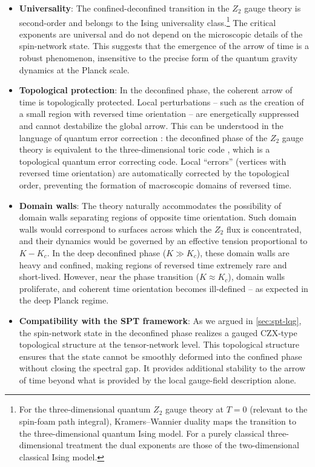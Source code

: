 \documentclass[preprint]{SciPost}
\theoremstyle{plain} %
\begin{document}
\begin{itemize}
	\item \textbf{Universality}: The confined-deconfined transition in the $Z_2$ gauge theory is second-order and belongs to the Ising universality class.\footnote{For the three-dimensional quantum $Z_2$ gauge theory at $T=0$ (relevant to the spin-foam path integral), Kramers--Wannier duality maps the transition to the three-dimensional quantum Ising model. For a purely classical three-dimensional treatment the dual exponents are those of the two-dimensional classical Ising model.} The critical exponents are universal and do not depend on the microscopic details of the spin-network state. This suggests that the emergence of the arrow of time is a robust phenomenon, insensitive to the precise form of the quantum gravity dynamics at the Planck scale.

	\item \textbf{Topological protection}: In the deconfined phase, the coherent arrow of time is topologically protected. Local perturbations -- such as the creation of a small region with reversed time orientation -- are energetically suppressed and cannot destabilize the global arrow. This can be understood in the language of quantum error correction \cite{Dennis2002Topological}: the deconfined phase of the $ Z_2 $ gauge theory is equivalent to the three-dimensional toric code \cite{Dennis2002Topological}, which is a topological quantum error correcting code. Local ``errors'' (vertices with reversed time orientation) are automatically corrected by the topological order, preventing the formation of macroscopic domains of reversed time.

	\item \textbf{Domain walls}: The theory naturally accommodates the possibility of domain walls separating regions of opposite time orientation. Such domain walls would correspond to surfaces across which the $ Z_2 $ flux is concentrated, and their dynamics would be governed by an effective tension proportional to $ K - K_c $. In the deep deconfined phase ($ K \gg K_c $), these domain walls are heavy and confined, making regions of reversed time extremely rare and short-lived. However, near the phase transition ($ K \approx K_c $), domain walls proliferate, and coherent time orientation becomes ill-defined -- as expected in the deep Planck regime.

	\item \textbf{Compatibility with the SPT framework}: As we argued in \autoref{sec:spt-lqg}, the spin-network state in the deconfined phase realizes a gauged CZX-type topological structure at the tensor-network level. This topological structure ensures that the state cannot be smoothly deformed into the confined phase without closing the spectral gap. It provides additional stability to the arrow of time beyond what is provided by the local gauge-field description alone.
\end{itemize}
\end{document}
